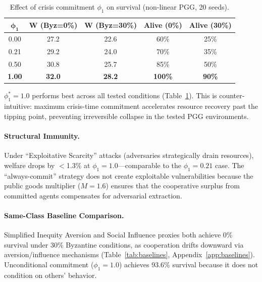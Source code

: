\documentclass{article}
\begin{document}
\begin{table}[t]
\centering
\caption{Effect of crisis commitment $\phi_1$ on survival (non-linear PGG, 20 seeds).}
\label{tab:phi1}
\begin{tabular}{ccccc}
\toprule
$\boldsymbol{\phi_1}$ & \textbf{W (Byz=0\%)} & \textbf{W (Byz=30\%)} & \textbf{Alive (0\%)} & \textbf{Alive (30\%)} \\
\midrule
0.00 & 27.2 & 22.6 & 60\% & 25\% \\
0.21 & 29.2 & 24.0 & 70\% & 35\% \\
0.50 & 30.8 & 25.7 & 85\% & 50\% \\
\textbf{1.00} & \textbf{32.0} & \textbf{28.2} & \textbf{100\%} & \textbf{90\%} \\
\bottomrule
\end{tabular}
\end{table}

$\phi_1^* = 1.0$ performs best across all tested conditions (Table~\ref{tab:phi1}).
This is counter-intuitive: maximum crisis-time commitment accelerates resource recovery past the tipping point, preventing irreversible collapse in the tested PGG environments.

\paragraph{Structural Immunity.}
Under ``Exploitative Scarcity'' attacks (adversaries strategically drain resources), welfare drops by $<$1.3\% at $\phi_1 = 1.0$---comparable to the $\phi_1 = 0.21$ case.
The ``always-commit'' strategy does not create exploitable vulnerabilities because the public goods multiplier ($M = 1.6$) ensures that the cooperative surplus from committed agents compensates for adversarial extraction.

\paragraph{Same-Class Baseline Comparison.}
Simplified Inequity Aversion and Social Influence proxies both achieve 0\% survival under 30\% Byzantine conditions, as cooperation drifts downward via aversion/influence mechanisms (Table~\ref{tab:baselines}, Appendix~\ref{app:baselines}).
Unconditional commitment ($\phi_1{=}1.0$) achieves 93.6\% survival because it does not condition on others' behavior.
\end{document}
